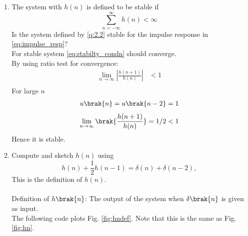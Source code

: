 \documentclass[journal,12pt,twocolumn]{IEEEtran}
\theoremstyle{remark}
\begin{document}
\begin{enumerate}[label=\thesection.\arabic*]
\item The system with $h(n)$ is defined to be stable if
\begin{equation}
\sum_{n=-\infty}^{\infty}h(n) < \infty \label{eq:stabilty_condn}
\end{equation}
Is the system defined by \eqref{q:2.2} stable for the impulse response in \eqref{eq:impulse_resp}?\\
\solution For stable system \eqref{eq:stabilty_condn} should converge.\\
By using ratio test for convergence:
\begin{align}
    \lim_{n \to \infty}\left|\frac{h(n + 1)}{h(n)}\right|&<1 \\
\end{align}
For large $n$ 
\begin{align}
    u\brak{n}=u\brak{n-2}=1
\end{align}
\begin{align}
  \lim_{n \to \infty}  \brak{\frac{h(n + 1)}{h(n)}} = 1/2 <1
\end{align}
Hence it is stable.
\item 
Compute and sketch $h(n)$ using 
\begin{equation}
\label{eq:iir_filter_h}
h(n) + \frac{1}{2}h(n-1) = \delta(n) + \delta(n-2), 
\end{equation}
%
This is the definition of $h(n)$.
\\
\solution\\
Definition of $h\brak{n}$: The output of the system when $\delta\brak{n}$ is given as input.\\

The following code plots Fig. \ref{fig:hndef}. Note that this is the same as Fig. 
\ref{fig:hn}. 


\end{enumerate}
\end{document}
